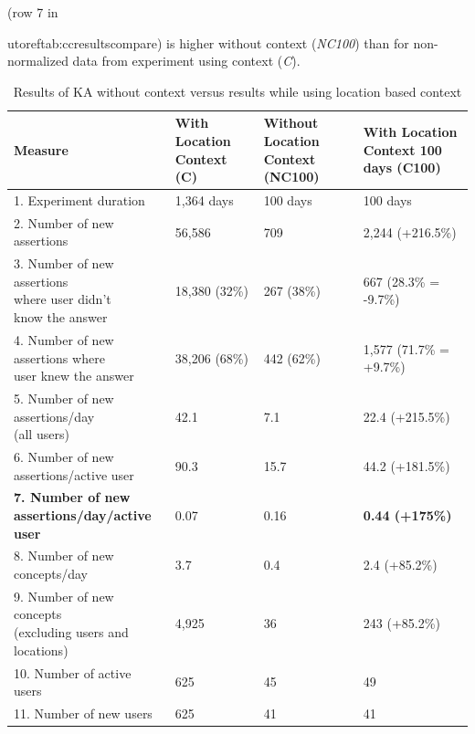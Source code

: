 (row 7 in {utoref{tab:ccresultscompare}) is higher without context 
(\emph{NC100}) than for  non-normalized data from experiment using context 
(\emph{C}).

\begin{table}[h]
\centering
\caption{Results of KA without context versus results while using location based context}
\label{tab:ccresultscompare}
\begin{tabular}{|l|l|l|l|}
	\hline
	\textbf{Measure}  & \makecell[l]{\textbf{With Location}\\\textbf{Context (C)}} & \makecell[l]{\textbf{Without Location}\\ \textbf{Context (NC100)}} &  \makecell[l]{\textbf{With Location}\\\textbf{Context 100}\\\textbf{days (C100)}}\\
    \hline
    1. Experiment duration & 1,364 days & 100 days & 100 days \\
    \hline
    2. Number of new assertions & 56,586 & 709 & 2,244 (+216.5\%) \\
    \hline
    \makecell[l]{3. Number of new assertions\\where user didn't\\ know the answer} & 18,380 (32\%) & 267 (38\%) & 667 (28.3\% = -9.7\%) \\
	\hline 
    \makecell[l]{4. Number of new \\assertions where \\user knew the answer}  &38,206 (68\%) & 442 (62\%) & 1,577 (71.7\% = +9.7\%) \\
	\hline
    \makecell[l]{5. Number of new \\assertions/day \\(all users) } & 42.1 & 7.1 & 22.4 (+215.5\%)\\
	\hline
    \makecell[l]{6. Number of new \\assertions/active user } & 90.3 & 15.7 & 44.2 (+181.5\%) \\
	\hline
    \makecell[l]{\textbf{7. Number of new}\\\textbf{assertions/day/active}\\\textbf{user}} & 0.07 & 0.16 & \textbf{0.44 (+175\%)} \\
	\hline
    \makecell[l]{8. Number of new \\concepts/day} & 3.7 & 0.4 & 2.4 (+85.2\%) \\
	\hline
    \makecell[l]{9. Number of new concepts \\ (excluding users and\\ locations)} & 4,925 & 36 & 243 (+85.2\%) \\
	\hline
    10. Number of active users & 625 & 45 & 49 \\
	\hline
    11. Number of new users & 625 & 41 & 41 \\
	\hline
\end{tabular}
\end{table}

}
